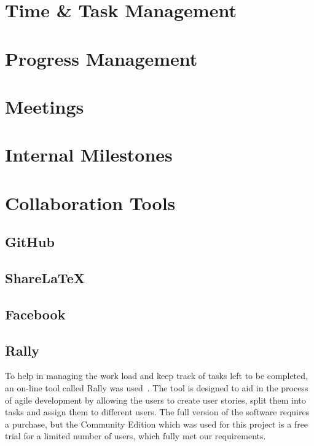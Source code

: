 
\section{Time \& Task Management}

\section{Progress Management}
\label{sec:progress_management}

    \section{Meetings}
    
    \section{Internal Milestones}

\section{Collaboration Tools}
    \subsection{GitHub}
    
    \subsection{ShareLaTeX}
    
    \subsection{Facebook}
    
    \subsection{Rally}
        To help in managing the work load and keep track of tasks left to be completed, an on-line tool called Rally was used~\cite{rally}. The tool is designed to aid in the process of agile development by allowing the users to create user stories, split them into tasks and assign them to different users. The full version of the software requires a purchase, but the Community Edition which was used for this project is a free trial for a limited number of users, which fully met our requirements.
    
